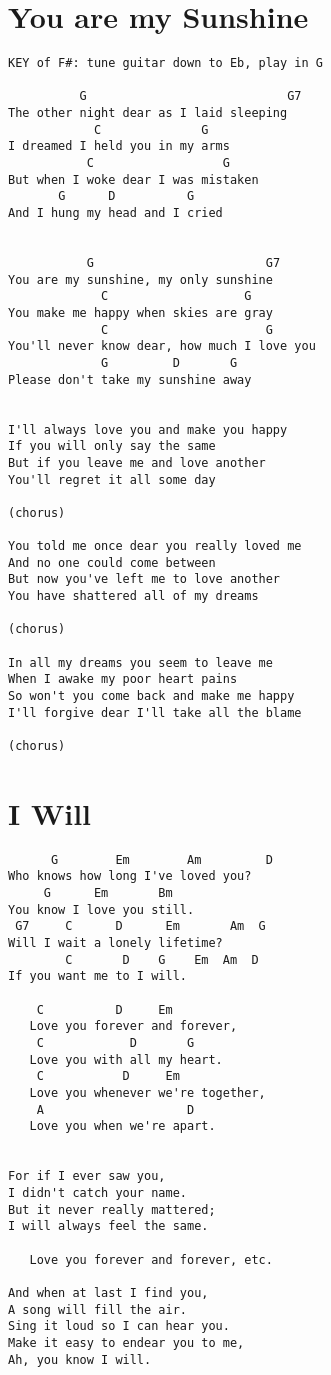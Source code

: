 \documentclass[leqno]{memoir}
\begin{document}
\chapter{You are my Sunshine}
\begin{verbatim}
KEY of F#: tune guitar down to Eb, play in G

          G                            G7
The other night dear as I laid sleeping
            C              G
I dreamed I held you in my arms
           C                  G
But when I woke dear I was mistaken
       G      D          G
And I hung my head and I cried


           G                        G7
You are my sunshine, my only sunshine
             C                   G
You make me happy when skies are gray
             C                      G
You'll never know dear, how much I love you
             G         D       G
Please don't take my sunshine away


I'll always love you and make you happy
If you will only say the same
But if you leave me and love another
You'll regret it all some day

(chorus)

You told me once dear you really loved me
And no one could come between
But now you've left me to love another
You have shattered all of my dreams

(chorus)

In all my dreams you seem to leave me
When I awake my poor heart pains
So won't you come back and make me happy
I'll forgive dear I'll take all the blame

(chorus)

\end{verbatim}
\newpage

\chapter{I Will}
\begin{verbatim}
      G        Em        Am         D
Who knows how long I've loved you?
     G      Em       Bm    
You know I love you still.
 G7     C      D      Em       Am  G
Will I wait a lonely lifetime?
        C       D    G    Em  Am  D
If you want me to I will.

    C          D     Em
   Love you forever and forever,
    C            D       G
   Love you with all my heart.
    C           D     Em
   Love you whenever we're together,
    A                    D
   Love you when we're apart.


For if I ever saw you,
I didn't catch your name.
But it never really mattered;
I will always feel the same.

   Love you forever and forever, etc.

And when at last I find you,
A song will fill the air.
Sing it loud so I can hear you.
Make it easy to endear you to me,
Ah, you know I will.
\end{verbatim}
\newpage
\end{document}
